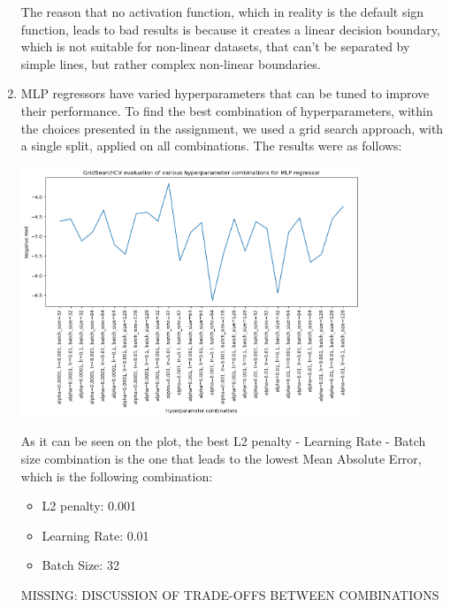 \documentclass[12pt]{article}
\begin{document}
\begin{enumerate}[leftmargin=\labelsep, label=\textbf{\arabic*.)},start=5]
          The reason that no activation function, which in reality is the default sign function, leads to bad results is because it creates a linear decision boundary, which is not suitable for non-linear datasets, that can't be separated by simple lines, but rather complex non-linear boundaries.

    \item MLP regressors have varied hyperparameters that can be tuned to improve their performance. To find the best combination of hyperparameters, within the choices presented in the assignment, we used a grid search approach, with a single split, applied on all combinations. The results were as follows:

          \begin{center}
              \includegraphics[width=0.8\textwidth]{hyperparameters_performance_plot.png}
          \end{center}

          As it can be seen on the plot, the best L2 penalty - Learning Rate - Batch size combination is the one that leads to the lowest Mean Absolute Error, which is the following combination:

            \begin{itemize}
                \item L2 penalty: 0.001
                \item Learning Rate: 0.01
                \item Batch Size: 32
            \end{itemize}
        
            MISSING: DISCUSSION OF TRADE-OFFS BETWEEN COMBINATIONS
\end{enumerate}
\end{document}

